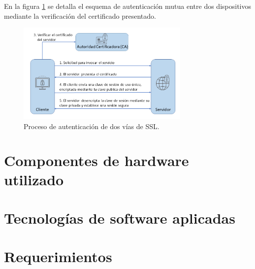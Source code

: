 En la figura \ref{fig:ssl2way} se detalla el esquema de autenticación mutua entre dos dispositivos mediante la verificación del certificado presentado.

\begin{figure}[h]
	\centering
	\includegraphics[width=0.75\textwidth]{./Figures/tls.png}
	\caption[Proceso de autenticación de dos vías de SSL.]{Proceso de autenticación de dos vías de SSL\protect\footnotemark.}
	\label{fig:ssl2way}

\end{figure}
	
\section{Componentes de hardware utilizado}
\label{sec:Hardware utilizado}

\section{Tecnologías de software aplicadas}
\label{sec:Software aplicado}

\section{Requerimientos}
\label{sec:Requerimientos}

